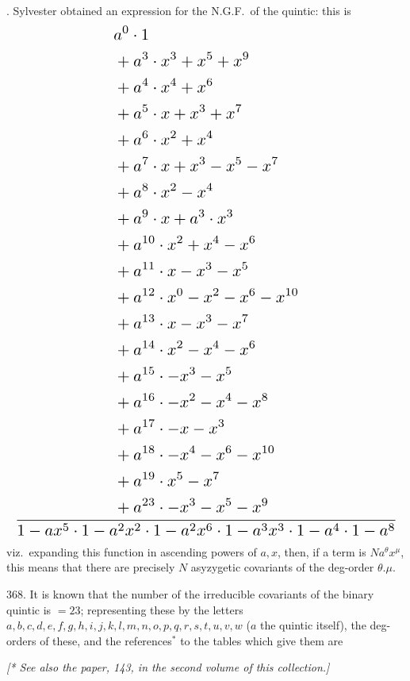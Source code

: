 \documentclass[11pt]{article}
\begin{document}

. Sylvester obtained an expression for the N.G.F.\ of the quintic: this is
\[
\resizebox{\textwidth}{!}{$\displaystyle
\frac{
\begin{aligned}
& a^{0}\cdot 1\\
& + a^{3}\cdot x^{3} + x^{5} + x^{9}\\
& + a^{4}\cdot x^{4} + x^{6}\\
& + a^{5}\cdot x + x^{3} + x^{7}\\
& + a^{6}\cdot x^{2} + x^{4}\\
& + a^{7}\cdot x + x^{3} - x^{5} - x^{7}\\
& + a^{8}\cdot x^{2} - x^{4}\\
& + a^{9}\cdot x + a^{3}\cdot x^{3}\\
& + a^{10}\cdot x^{2} + x^{4} - x^{6}\\
& + a^{11}\cdot x - x^{3} - x^{5}\\
& + a^{12}\cdot x^{0} - x^{2} - x^{6} - x^{10}\\
& + a^{13}\cdot x - x^{3} - x^{7}\\
& + a^{14}\cdot x^{2} - x^{4} - x^{6}\\
& + a^{15}\cdot -x^{3} - x^{5}\\
& + a^{16}\cdot -x^{2} - x^{4} - x^{8}\\
& + a^{17}\cdot -x - x^{3}\\
& + a^{18}\cdot -x^{4} - x^{6} - x^{10}\\
& + a^{19}\cdot x^{5} - x^{7}\\
& + a^{23}\cdot -x^{3} - x^{5} - x^{9}
\end{aligned}
}{1 - ax^{5}\cdot 1 - a^{2}x^{2}\cdot 1 - a^{2}x^{6}\cdot 1 - a^{3}x^{3}\cdot 1 - a^{4}\cdot 1 - a^{8}}$}
\]
viz.\ expanding this function in ascending powers of $a, x$, then, if a term is $N a^{\theta}x^{\mu}$, this means that there are precisely $N$ asyzygetic covariants of the deg-order $\theta.\mu$.

368. It is known that the number of the irreducible covariants of the binary quintic is $=23$; representing these by the letters $a, b, c, d, e, f, g, h, i, j, k, l, m, n, o, p, q, r, s, t, u, v, w$ ($a$ the quintic itself), the deg-orders of these, and the references$^{*}$ to the tables which give them are

\medskip

\noindent\textit{[* See also the paper, 143, in the second volume of this collection.]}
\end{document}
